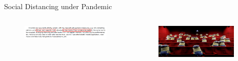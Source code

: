 \begin{frame}{Social Distancing under Pandemic}
\begin{itemize}
\begin{columns}[c]
        \begin{figure}[ht]
          \centering
          \includegraphics[width = 1.1\textwidth]{./images/cinema.png}
        \end{figure}
        \column{3.5cm}
        \scriptsize
        \begin{figure}[ht]
          \centering
          \includegraphics[width = 0.9\textwidth]{./images/cinema2.jpg}
        \end{figure}
        \end{columns} 
  \end{itemize}
  \end{frame}
